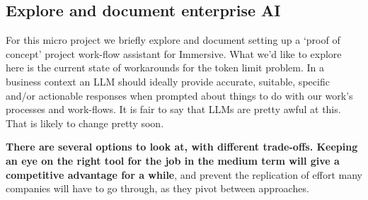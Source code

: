 

\subsection{Explore and document enterprise AI}
For this micro project we briefly explore and document setting up a `proof of concept' project work-flow assistant for Immersive. What we'd like to explore here is the current state of workarounds for the token limit problem. In a business context an LLM should ideally provide accurate, suitable, specific and/or actionable responses when prompted about things to do with our work's processes and work-flows. It is fair to say that LLMs are pretty awful at this. That is likely to change pretty soon. \par
\textbf{There are several options to look at, with different trade-offs. Keeping an eye on the right tool for the job in the medium term will give a competitive advantage for a while}, and prevent the replication of effort many companies will have to go through, as they pivot between approaches.
